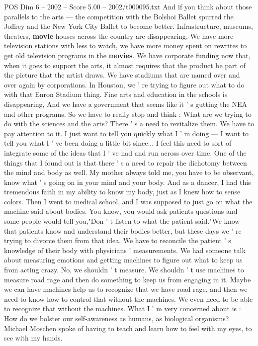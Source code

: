 \begin{textsample}{POS Dim 6 – 2002 – Score 5.00 – 2002/t000095.txt}
And if you think about those parallels to the arts — the competition with the Bolshoi Ballet spurred the Joffrey and the New York City Ballet to become better.
Infrastructure, museums, theaters, \textbf{movie} houses across the country are disappearing.
We have more television stations with less to watch, we have more money spent on rewrites to get old television programs in the \textbf{movies}.
We have corporate funding now that, when it goes to support the arts, it almost requires that the product be part of the picture that the artist draws.
We have stadiums that are named over and over again by corporations.
In Houston, we ' re trying to figure out what to do with that Enron Stadium thing.
Fine arts and education in the schools is disappearing, And we have a government that seems like it ' s gutting the NEA and other programs.
So we have to really stop and think : What are we trying to do with the sciences and the arts?
There ' s a need to revitalize them.
We have to pay attention to it.
I just want to tell you quickly what I ' m doing — I want to tell you what I ' ve been doing a little bit since...
I feel this need to sort of integrate some of the ideas that I ' ve had and run across over time.
One of the things that I found out is that there ' s a need to repair the dichotomy between the mind and body as well.
My mother always told me, you have to be observant, know what ' s going on in your mind and your body.
And as a dancer, I had this tremendous faith in my ability to know my body, just as I knew how to sense colors.
Then I went to medical school, and I was supposed to just go on what the machine said about bodies.
You know, you would ask patients questions and some people would tell you,"Don ' t listen to what the patient said."We know that patients know and understand their bodies better, but these days we ' re trying to divorce them from that idea.
We have to reconcile the patient ' s knowledge of their body with physicians ' measurements.
We had someone talk about measuring emotions and getting machines to figure out what to keep us from acting crazy.
No, we shouldn ' t measure.
We shouldn ' t use machines to measure road rage and then do something to keep us from engaging in it.
Maybe we can have machines help us to recognize that we have road rage, and then we need to know how to control that without the machines.
We even need to be able to recognize that without the machines.
What I ' m very concerned about is : How do we bolster our self-awareness as humans, as biological organisms?
Michael Moschen spoke of having to teach and learn how to feel with my eyes, to see with my hands.

\end{textsample}

